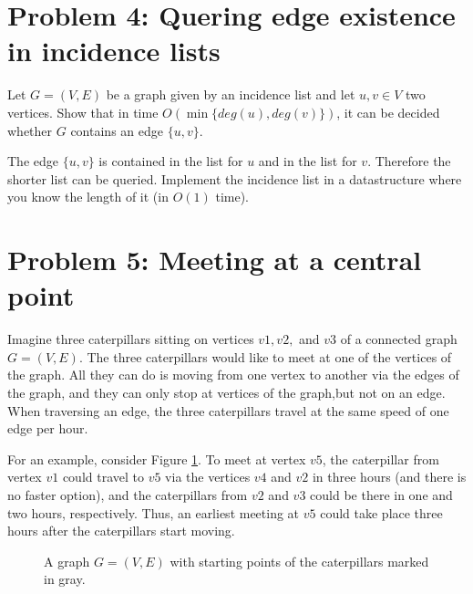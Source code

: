\documentclass[12pt, a4]{article}
\begin{document}
\section{Problem 4: Quering edge existence in incidence lists}
Let $G= (V, E)$ be a graph given by an incidence list and let $u, v\in V$ two vertices. Show that in time $O(\min\{deg(u),deg(v)\})$, it can be decided whether $G$ contains an edge $\{u, v\}$.

The edge $\{u,v\}$ is contained in the list for $u$ and in the list for $v$. Therefore the shorter list can be queried. Implement the incidence list in a datastructure where you know the length of it (in $O(1)$ time).

\section{Problem 5: Meeting at a central point}
Imagine three caterpillars sitting on vertices $v1,v2,$ and $v3$ of a connected graph $G= (V, E)$. The three caterpillars would like to meet at one of the vertices of the graph. All they can do is moving from one vertex to another via the edges of the graph, and they can only stop at vertices of the graph,but not on an edge. When traversing an edge, the three caterpillars travel at the same speed of one edge per hour.

 For an example, consider Figure \ref{fig:graph_caterpillar}. To meet at vertex $v5$, the caterpillar from vertex $v1$ could travel to $v5$ via the vertices $v4$ and $v2$ in three hours (and there is no faster option), and the caterpillars from $v2$ and $v3$ could be there in one and two hours, respectively. Thus, an earliest meeting at $v5$ could take place three hours after the caterpillars start moving.
 
 \begin{figure}[h]
 	\centering
 	\label{fig:graph_caterpillar}
\caption{A graph $G= (V, E)$ with starting points of the caterpillars marked in gray.}
 	\end{figure}
 
\end{document}
